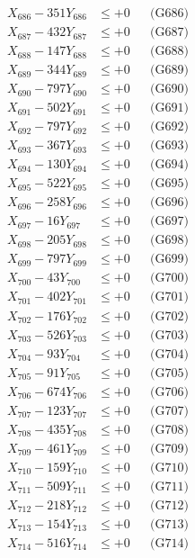 \documentclass[a4paper,10pt]{article}
\begin{document}
{\begin{align}
X_{686} - 351Y_{686} &\leq +0 && \text{(G686)} \\
X_{687} - 432Y_{687} &\leq +0 && \text{(G687)} \\
X_{688} - 147Y_{688} &\leq +0 && \text{(G688)} \\
X_{689} - 344Y_{689} &\leq +0 && \text{(G689)} \\
X_{690} - 797Y_{690} &\leq +0 && \text{(G690)} \\
\allowbreak
X_{691} - 502Y_{691} &\leq +0 && \text{(G691)} \\
X_{692} - 797Y_{692} &\leq +0 && \text{(G692)} \\
X_{693} - 367Y_{693} &\leq +0 && \text{(G693)} \\
X_{694} - 130Y_{694} &\leq +0 && \text{(G694)} \\
X_{695} - 522Y_{695} &\leq +0 && \text{(G695)} \\
X_{696} - 258Y_{696} &\leq +0 && \text{(G696)} \\
X_{697} - 16Y_{697} &\leq +0 && \text{(G697)} \\
X_{698} - 205Y_{698} &\leq +0 && \text{(G698)} \\
X_{699} - 797Y_{699} &\leq +0 && \text{(G699)} \\
X_{700} - 43Y_{700} &\leq +0 && \text{(G700)} \\
\allowbreak
X_{701} - 402Y_{701} &\leq +0 && \text{(G701)} \\
X_{702} - 176Y_{702} &\leq +0 && \text{(G702)} \\
X_{703} - 526Y_{703} &\leq +0 && \text{(G703)} \\
X_{704} - 93Y_{704} &\leq +0 && \text{(G704)} \\
X_{705} - 91Y_{705} &\leq +0 && \text{(G705)} \\
X_{706} - 674Y_{706} &\leq +0 && \text{(G706)} \\
X_{707} - 123Y_{707} &\leq +0 && \text{(G707)} \\
X_{708} - 435Y_{708} &\leq +0 && \text{(G708)} \\
X_{709} - 461Y_{709} &\leq +0 && \text{(G709)} \\
X_{710} - 159Y_{710} &\leq +0 && \text{(G710)} \\
\allowbreak
X_{711} - 509Y_{711} &\leq +0 && \text{(G711)} \\
X_{712} - 218Y_{712} &\leq +0 && \text{(G712)} \\
X_{713} - 154Y_{713} &\leq +0 && \text{(G713)} \\
X_{714} - 516Y_{714} &\leq +0 && \text{(G714)} \\

\end{align}}
\end{document}
